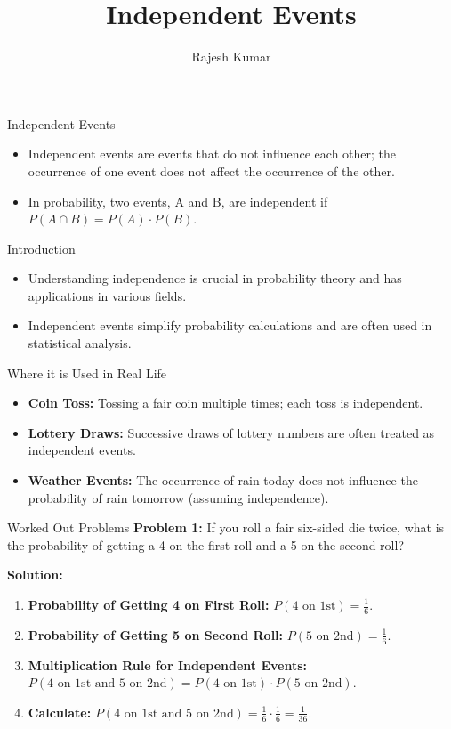 \title{Independent Events}
\author{Rajesh Kumar}
\date{}

\begin{frame}
  \titlepage
\end{frame}

\begin{frame}{Independent Events}
  \begin{itemize}
    \item Independent events are events that do not influence each other; the occurrence of one event does not affect the occurrence of the other.
    \item In probability, two events, A and B, are independent if \( P(A \cap B) = P(A) \cdot P(B) \).
  \end{itemize}
\end{frame}

\begin{frame}{Introduction}
  \begin{itemize}
    \item Understanding independence is crucial in probability theory and has applications in various fields.
    \item Independent events simplify probability calculations and are often used in statistical analysis.
  \end{itemize}
\end{frame}

\begin{frame}{Where it is Used in Real Life}
  \begin{itemize}
    \item \textbf{Coin Toss:} Tossing a fair coin multiple times; each toss is independent.
    \item \textbf{Lottery Draws:} Successive draws of lottery numbers are often treated as independent events.
    \item \textbf{Weather Events:} The occurrence of rain today does not influence the probability of rain tomorrow (assuming independence).
  \end{itemize}
\end{frame}

\begin{frame}{Worked Out Problems}
  \textbf{Problem 1:} If you roll a fair six-sided die twice, what is the probability of getting a 4 on the first roll and a 5 on the second roll?

  \textbf{Solution:}
  \begin{enumerate}
    \item \textbf{Probability of Getting 4 on First Roll:} \(P(\text{4 on 1st}) = \frac{1}{6}\).
    \item \textbf{Probability of Getting 5 on Second Roll:} \(P(\text{5 on 2nd}) = \frac{1}{6}\).
    \item \textbf{Multiplication Rule for Independent Events:} \(P(\text{4 on 1st and 5 on 2nd}) = P(\text{4 on 1st}) \cdot P(\text{5 on 2nd})\).
    \item \textbf{Calculate:} \(P(\text{4 on 1st and 5 on 2nd}) = \frac{1}{6} \cdot \frac{1}{6} = \frac{1}{36}\).
  \end{enumerate}
\end{frame}

